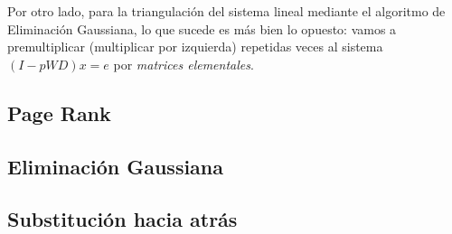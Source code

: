 		Por otro lado, para la triangulación del sistema lineal mediante el algoritmo de Eliminación Gaussiana, lo que sucede es más bien lo opuesto: vamos a premultiplicar (multiplicar por izquierda) repetidas veces al sistema $(I - pWD) x = e$ por \textit{matrices elementales}. \\

	\subsection{Page Rank}

	\subsection{Eliminación Gaussiana}

	\subsection{Substitución hacia atrás}

